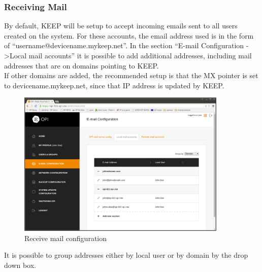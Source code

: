 \documentclass[12pt,a4paper,titlepage]{article}
\begin{document}
\subsubsection{Receiving Mail}
By default, KEEP will be setup to accept incoming emails sent to all users created on the system. For these accounts, the email address used is in the form of ``username@devicename.mykeep.net''. In the section ``E-mail Configuration -\textgreater Local mail accounts'' it is possible to add additional addresses, including mail addresses that are on domains pointing to KEEP.\\
If other domains are added, the recommended setup is that the MX pointer is set to devicename.mykeep.net, since that IP address is updated by KEEP.
\begin{figure}[h!]
\centering
\includegraphics[width=10cm]{./img/receive-mail}
\caption{Receive mail configuration}
\end{figure}

It is possible to group addresses either by local user or by domain by the drop down box.
\end{document}
